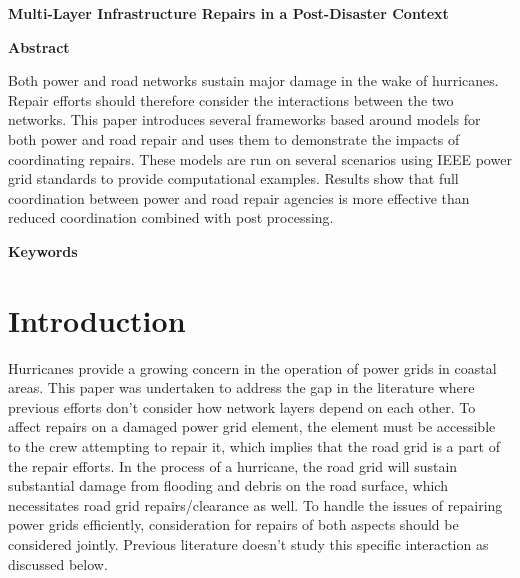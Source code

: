 \documentclass[10pt]{article}
\begin{document}
\newpage
\thispagestyle{empty}
\begin{center}
{\Large \textbf{ Multi-Layer Infrastructure Repairs in a Post-Disaster Context}} \\
\vspace*{0.2cm}
\end{center}

\thispagestyle{empty}
\begin{center}
{\large \bf Abstract}
\end{center}
Both power and road networks sustain major damage in the wake of hurricanes. Repair efforts should therefore consider the interactions between the two networks. This paper introduces several frameworks based around models for both power and road repair and uses them to demonstrate the impacts of coordinating repairs. These models are run on several scenarios using IEEE power grid standards to provide computational examples. Results show that full coordination between power and road repair agencies is more effective than reduced coordination combined with post processing.



{\large \bf Keywords}\\
\vspace*{-12pt}

\vspace*{-12pt}
\section{{\large Introduction}}
\label{sec:ic:intro}
\vspace*{-12pt}

Hurricanes provide a growing concern in the operation of power grids in coastal areas. This paper was undertaken to address the gap in the literature where previous efforts don't consider how network layers depend on each other. To affect  repairs on a damaged power grid element, the element must be accessible to the crew attempting to repair it, which implies that the road grid is a part of the repair efforts. In the process of a hurricane, the road grid will sustain substantial damage from flooding and debris on the road surface, which necessitates road grid repairs/clearance as well. To handle the issues of repairing power grids efficiently, consideration for repairs of both aspects should be considered jointly. Previous literature doesn't study this specific interaction as discussed below.
\vspace*{-12pt}
\end{document}
